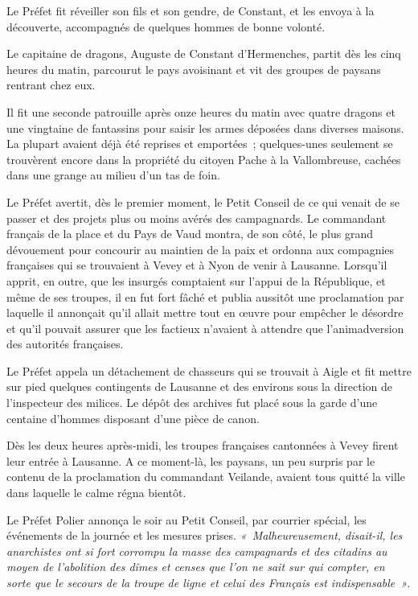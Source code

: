 \documentclass[french,twoside]{book} %
\begin{document}
\noindent Le Préfet fit réveiller son fils et son gendre, de Constant, et les envoya à la découverte, accompagnés de quelques hommes de bonne volonté.\par
Le capitaine de dragons, Auguste de Constant d’Hermenches, partit dès les cinq heures du matin, parcourut le pays avoisinant et vit des groupes de paysans rentrant chez eux.\par
Il fit une seconde patrouille après onze heures du matin avec quatre dragons et une vingtaine de fantassins pour saisir les armes déposées dans diverses maisons. La plupart avaient déjà été reprises et emportées ; quelques-unes seulement se trouvèrent encore dans la propriété du citoyen Pache à la Vallombreuse, cachées dans une grange au milieu d’un tas de foin.\par
Le Préfet avertit, dès le premier moment, le Petit Conseil de ce qui venait de se passer et des projets plus ou moins avérés des campagnards. Le commandant français de la place et du Pays de Vaud montra, de son côté, le plus grand dévouement pour concourir au maintien de la paix et ordonna aux compagnies françaises qui se trouvaient à Vevey et à Nyon de venir à Lausanne. Lorsqu’il apprit, en outre, que les insurgés comptaient sur l’appui de la République, et même de ses troupes, il en fut fort fâché et publia aussitôt une proclamation par laquelle il annonçait qu’il allait mettre tout en œuvre pour empêcher le désordre et qu’il pouvait assurer que les factieux n’avaient à attendre que l’animadversion des autorités françaises.\par
Le Préfet appela un détachement de chasseurs qui se trouvait à Aigle et fit mettre sur pied quelques contingents de Lausanne et des environs sous la direction de l’inspecteur des milices. Le dépôt des archives fut placé sous la garde d’une centaine d’hommes disposant d’une pièce de canon.\par
Dès les deux heures après-midi, les troupes françaises cantonnées à Vevey firent leur entrée à Lausanne. A ce moment-là, les paysans, un peu surpris par le contenu de la proclamation du commandant Veilande, avaient tous quitté la ville dans laquelle le calme régna bientôt.\par
Le Préfet Polier annonça le soir au Petit Conseil, par courrier spécial, les événements de la journée et les mesures prises. \emph{« Malheureusement, disait-il, les anarchistes ont si fort corrompu la masse des campagnards et des citadins au moyen de l’abolition des dîmes et censes que l’on ne sait sur qui compter, en sorte que le secours de la troupe de ligne et celui des Français est indispensable »}.
\end{document}
